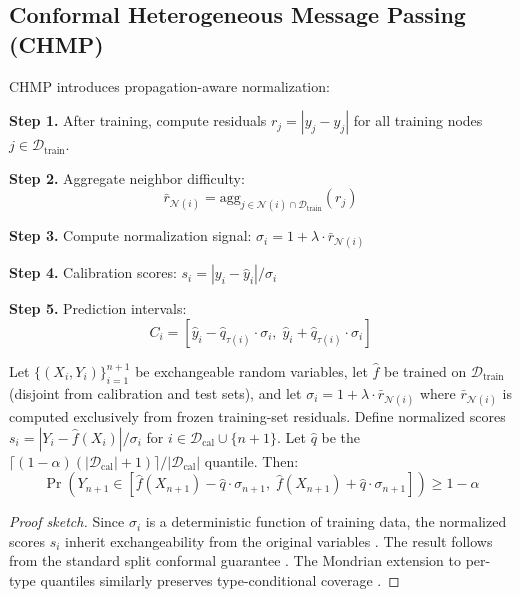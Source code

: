 \documentclass[twoside,11pt]{article}
\begin{document}
\subsection{Conformal Heterogeneous Message Passing (CHMP)}

CHMP introduces propagation-aware normalization:

\textbf{Step 1.} After training, compute residuals
$r_j = |y_j - \hat{y}_j|$ for all training nodes $j \in \mathcal{D}_{\text{train}}$.

\textbf{Step 2.} Aggregate neighbor difficulty:
\begin{equation}
\bar{r}_{\mathcal{N}(i)} = \text{agg}_{j \in \mathcal{N}(i) \cap
\mathcal{D}_{\text{train}}} (r_j)
\end{equation}

\textbf{Step 3.} Compute normalization signal:
$\sigma_i = 1 + \lambda \cdot \bar{r}_{\mathcal{N}(i)}$

\textbf{Step 4.} Calibration scores: $s_i = |y_i - \hat{y}_i| / \sigma_i$

\textbf{Step 5.} Prediction intervals:
\begin{equation}
C_i = [\hat{y}_i - \hat{q}_{\tau(i)} \cdot \sigma_i, \;
\hat{y}_i + \hat{q}_{\tau(i)} \cdot \sigma_i]
\end{equation}

\begin{theorem}
\label{thm:chmp}
Let $\{(X_i, Y_i)\}_{i=1}^{n+1}$ be exchangeable random variables, let
$\hat{f}$ be trained on $\mathcal{D}_{\text{train}}$ (disjoint from
calibration and test sets), and let $\sigma_i = 1 + \lambda \cdot
\bar{r}_{\mathcal{N}(i)}$ where $\bar{r}_{\mathcal{N}(i)}$ is computed
exclusively from frozen training-set residuals. Define normalized scores
$s_i = |Y_i - \hat{f}(X_i)| / \sigma_i$ for
$i \in \mathcal{D}_{\text{cal}} \cup \{n+1\}$. Let $\hat{q}$ be the
$\lceil(1-\alpha)(|\mathcal{D}_{\text{cal}}|+1)\rceil /
|\mathcal{D}_{\text{cal}}|$ quantile. Then:
\begin{equation}
\Pr\!\left(Y_{n+1} \in [\hat{f}(X_{n+1}) - \hat{q} \cdot \sigma_{n+1},
\; \hat{f}(X_{n+1}) + \hat{q} \cdot \sigma_{n+1}]\right) \geq 1 - \alpha
\end{equation}
\end{theorem}

\begin{proof}[Proof sketch]
Since $\sigma_i$ is a deterministic function of training data, the normalized
scores $s_i$ inherit exchangeability from the original variables
\citep{barber2023conformal}. The result follows from the standard split
conformal guarantee \citep{papadopoulos2002inductive,lei2018distribution}.
The Mondrian extension to per-type quantiles similarly preserves
type-conditional coverage \citep{vovk2012conditional}.
\end{proof}
\end{document}
